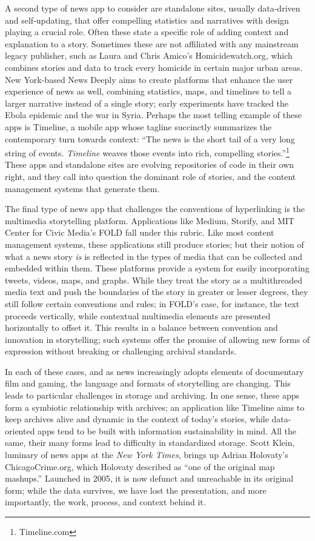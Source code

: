 A second type of news app to consider are standalone sites, usually data-driven and self-updating, that offer compelling statistics and narratives with design playing a crucial role. Often these state a specific role of adding context and explanation to a story. Sometimes these are not affiliated with any mainstream legacy publisher, such as Laura and Chris Amico's Homicidewatch.org, which combines stories and data to track every homicide in certain major urban areas. New York-based News Deeply aims to create platforms that enhance the user experience of news as well, combining statistics, maps, and timelines to tell a larger narrative instead of a single story; early experiments have tracked the Ebola epidemic and the war in Syria. Perhaps the most telling example of these apps is Timeline, a mobile app whose tagline succinctly summarizes the contemporary turn towards context: ``The news is the short tail of a very long string of events. \emph{Timeline} weaves those events into rich, compelling stories.''\footnote{Timeline.com} These apps and standalone sites are evolving repositories of code in their own right, and they call into question the dominant role of stories, and the content management systems that generate them.

The final type of news app that challenges the conventions of hyperlinking is the multimedia storytelling platform. Applications like Medium, Storify, and MIT Center for Civic Media's FOLD fall under this rubric. Like most content management systems, these applications still produce stories; but their notion of what a news story \emph{is} is reflected in the types of media that can be collected and embedded within them. These platforms provide a system for easily incorporating tweets, videos, maps, and graphs. While they treat the story as a multithreaded media text and push the boundaries of the story in greater or lesser degrees, they still follow certain conventions and rules; in FOLD's case, for instance, the text proceeds vertically, while contextual multimedia elements are presented horizontally to offset it. This results in a balance between convention and innovation in storytelling; such systems offer the promise of allowing new forms of expression without breaking or challenging archival standards.

In each of these cases, and as news increasingly adopts elements of documentary film and gaming, the language and formats of storytelling are changing. This leads to particular challenges in storage and archiving. In one sense, these apps form a symbiotic relationship with archives; an application like Timeline aims to keep archives alive and dynamic in the context of today's stories, while data-oriented apps tend to be built with information sustainability in mind. All the same, their many forms lead to difficulty in standardized storage. Scott Klein, luminary of news apps at the \emph{New York Times}, brings up Adrian Holovaty's ChicagoCrime.org, which Holovaty described as ``one of the original map mashups.''\autocite{holovaty_memory_2008} Launched in 2005, it is now defunct and unreachable in its original form; while the data survives, we have lost the presentation, and more importantly, the work, process, and context behind it.

